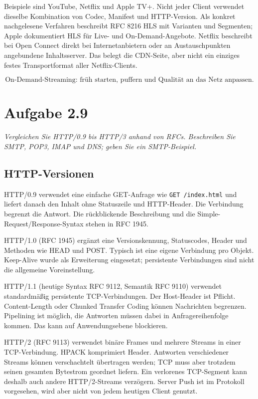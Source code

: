 \documentclass[a4paper,11pt]{article}
\newif\ifexplain
\newcommand{\aufgabe}[1]{\section*{Aufgabe #1}}
\newcommand{\angabe}[1]{{\raggedright\textit{#1}\par}\smallskip}
\newcommand{\explain}[1]{\ifexplain\begin{erklbox}#1\end{erklbox}\fi}
\begin{document}
Beispiele sind YouTube, Netflix und Apple TV+. Nicht jeder Client verwendet dieselbe Kombination von Codec, Manifest und HTTP-Version. Als konkret nachgelesene Verfahren beschreibt RFC 8216 HLS mit Varianten und Segmenten; Apple dokumentiert HLS für Live- und On-Demand-Angebote. Netflix beschreibt bei Open Connect direkt bei Internetanbietern oder an Austauschpunkten angebundene Inhaltsserver. Das belegt die CDN-Seite, aber nicht ein einziges festes Transportformat aller Netflix-Clients.
\explain{Der Player entscheidet wiederholt, welches Segment als Nächstes sinnvoll ist. Die Videoqualität kann daher während der Wiedergabe wechseln. Ein schneller Start und ein ausreichend gefüllter Puffer sind unterschiedliche Ziele: Erst wenig laden startet schnell, mehr Vorrat hilft später gegen Unterbrechungen.}
\[\boxed{\text{On-Demand-Streaming: früh starten, puffern und Qualität an das Netz anpassen.}}\]

\aufgabe{2.9}
\angabe{Vergleichen Sie HTTP/0.9 bis HTTP/3 anhand von RFCs. Beschreiben Sie SMTP, POP3, IMAP und DNS; geben Sie ein SMTP-Beispiel.}
\subsection*{HTTP-Versionen}
HTTP/0.9 verwendet eine einfache GET-Anfrage wie \texttt{GET /index.html} und liefert danach den Inhalt ohne Statuszeile und HTTP-Header. Die Verbindung begrenzt die Antwort. Die rückblickende Beschreibung und die Simple-Request/Response-Syntax stehen in RFC 1945.

HTTP/1.0 (RFC 1945) ergänzt eine Versionskennung, Statuscodes, Header und Methoden wie HEAD und POST. Typisch ist eine eigene Verbindung pro Objekt. Keep-Alive wurde als Erweiterung eingesetzt; persistente Verbindungen sind nicht die allgemeine Voreinstellung.

HTTP/1.1 (heutige Syntax RFC 9112, Semantik RFC 9110) verwendet standardmäßig persistente TCP-Verbindungen. Der Host-Header ist Pflicht. Content-Length oder Chunked Transfer Coding können Nachrichten begrenzen. Pipelining ist möglich, die Antworten müssen dabei in Anfragereihenfolge kommen. Das kann auf Anwendungsebene blockieren.

HTTP/2 (RFC 9113) verwendet binäre Frames und mehrere Streams in einer TCP-Verbindung. HPACK komprimiert Header. Antworten verschiedener Streams können verschachtelt übertragen werden; TCP muss aber trotzdem seinen gesamten Bytestrom geordnet liefern. Ein verlorenes TCP-Segment kann deshalb auch andere HTTP/2-Streams verzögern. Server Push ist im Protokoll vorgesehen, wird aber nicht von jedem heutigen Client genutzt.
\end{document}
